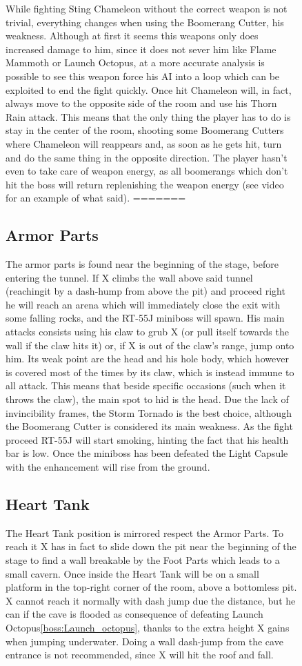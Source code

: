 \begin{figure}[htp]
While fighting Sting Chameleon without the correct weapon is not trivial, everything changes when using the Boomerang Cutter, his weakness. Although at first it seems this weapons only does increased damage to him, since it does not sever him like Flame Mammoth or Launch Octopus, at a more accurate analysis is possible to see this weapon force his AI into a loop which can be exploited to end the fight quickly. Once hit Chameleon will, in fact, always move to the opposite side of the room and use his Thorn Rain attack. This means that the only thing the player has to do is stay in the center of the room, shooting some Boomerang Cutters where Chameleon will reappears and, as soon as he gets hit, turn and do the same thing in the opposite direction. The player hasn't even to take care of weapon energy, as all boomerangs which don't hit the boss will return replenishing the weapon energy (see video  for an example of what said).  
=======
\subsection{Armor Parts}
The armor parts is found near the beginning of the stage, before entering the tunnel. If X climbs the wall above said tunnel (reachingit by a dash-hump from above the pit) and proceed right he will reach an arena which will immediately close the exit with some falling rocks, and the RT-55J miniboss will spawn. His main attacks consists using his claw to grub X (or pull itself towards the wall if the claw hits it) or, if X is out of the claw's range, jump onto him. Its weak point are the head and his hole body, which however is covered most of the times by its claw, which is instead immune to all attack. This means that beside specific occasions (such when it throws the claw), the main spot to hid is the head. Due the lack of invincibility frames, the Storm Tornado is the best choice, although the Boomerang Cutter is considered its main weakness\cite{wiki:RT55J}. As the fight proceed RT-55J will start smoking, hinting the fact that his health bar is low. Once the miniboss has been defeated the Light Capsule with the enhancement will rise from the ground.

\subsection{Heart Tank}
The Heart Tank position is mirrored respect the Armor Parts. To reach it X has in fact to slide down the pit near the beginning of the stage to find a wall breakable by the Foot Parts which leads to a small cavern. Once inside the Heart Tank will be on a small platform in the top-right corner of the room, above a bottomless pit. X cannot reach it normally with dash jump due the distance, but he can if  the cave is flooded as consequence of defeating Launch Octopus\ref{boss:Launch_octopus}, thanks to the extra height X gains when jumping underwater. Doing a wall dash-jump from the cave entrance is not recommended, since X will hit the roof and fall.


\end{figure}
